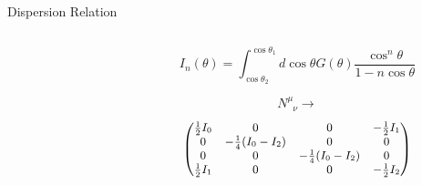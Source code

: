 \documentclass[9pt]{beamer}
\begin{document}
\begin{darkframes}
\begin{frame}{Dispersion Relation}
\begin{columns}[T]
\begin{column}{0.5\textwidth}



\end{column}

\begin{column}{0.5\textwidth}




   \begin{equation*}
      I_n(\theta)=\int_{\cos\theta_2}^{\cos\theta_1} d\cos\theta G(\theta) \frac{\cos^n\theta}{1 - n \cos\theta }
   \end{equation*}




   \begin{equation*}
      N^\mu_{\phantom{\mu}\nu} \to
   \end{equation*}
\begin{equation*}
    \small
  \begin{pmatrix}
   \frac{1}{2}  I_0 & 0 & 0 & -\frac{1}{2}I_1\\
   0 & -\frac{1}{4}(I_0-I_2) & 0 & 0\\
   0 & 0 & -\frac{1}{4}(I_0-I_2) & 0 \\
   \frac{1}{2}I_1 & 0 & 0 & -\frac{1}{2}I_2
   \end{pmatrix}
   \end{equation*}





\end{column}

\end{columns}

%


\end{frame}
\end{darkframes}
\end{document}
